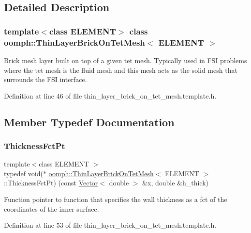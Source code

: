 \subsection{Detailed Description}
\subsubsection*{template$<$class E\+L\+E\+M\+E\+NT$>$\newline
class oomph\+::\+Thin\+Layer\+Brick\+On\+Tet\+Mesh$<$ E\+L\+E\+M\+E\+N\+T $>$}

Brick mesh layer built on top of a given tet mesh. Typically used in F\+SI problems where the tet mesh is the fluid mesh and this mesh acts as the solid mesh that surrounds the F\+SI interface. 

Definition at line 46 of file thin\+\_\+layer\+\_\+brick\+\_\+on\+\_\+tet\+\_\+mesh.\+template.\+h.



\subsection{Member Typedef Documentation}
\mbox{\label{classoomph_1_1ThinLayerBrickOnTetMesh_aed34f7d1e9a5c6b5f3e220cb5bdf4550}} 
\subsubsection{\texorpdfstring{Thickness\+Fct\+Pt}{ThicknessFctPt}}
{\footnotesize\ttfamily template$<$class E\+L\+E\+M\+E\+NT $>$ \\
typedef void($\ast$ \hyperlink{classoomph_1_1ThinLayerBrickOnTetMesh}{oomph\+::\+Thin\+Layer\+Brick\+On\+Tet\+Mesh}$<$ E\+L\+E\+M\+E\+NT $>$\+::Thickness\+Fct\+Pt) (const \hyperlink{classoomph_1_1Vector}{Vector}$<$ double $>$ \&x, double \&h\+\_\+thick)}



Function pointer to function that specifies the wall thickness as a fct of the coordinates of the inner surface. 



Definition at line 53 of file thin\+\_\+layer\+\_\+brick\+\_\+on\+\_\+tet\+\_\+mesh.\+template.\+h.



